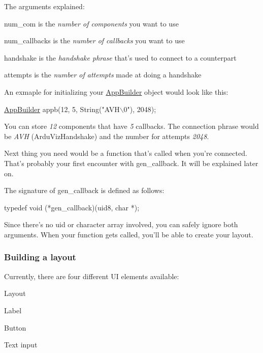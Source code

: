 The arguments explained\+:
\begin{DoxyItemize}
\item {\ttfamily num\+\_\+com} is the {\itshape number of components} you want to use
\item {\ttfamily num\+\_\+callbacks} is the {\itshape number of callbacks} you want to use
\item {\ttfamily handshake} is the {\itshape handshake phrase} that's used to connect to a counterpart
\item {\ttfamily attempts} is the {\itshape number of attempts} made at doing a handshake
\end{DoxyItemize}

An exmaple for initializing your \hyperlink{class_app_builder}{App\+Builder} object would look like this\+:


\begin{DoxyCode}
\hyperlink{class_app_builder}{AppBuilder} appb(12, 5, String(\textcolor{stringliteral}{"AVH\(\backslash\)0"}), 2048);
\end{DoxyCode}


You can store {\itshape 12} components that have {\itshape 5} callbacks. The connection phrase would be {\itshape A\+V\+H} (Ardu\+Viz\+Handshake) and the number for attempts {\itshape 2048}.

Next thing you need would be a function that's called when you're connected. That's probably your first encounter with {\ttfamily gen\+\_\+callback}. It will be explained later on.

The signature of {\ttfamily gen\+\_\+callback} is defined as follows\+: 
\begin{DoxyCode}
\textcolor{keyword}{typedef} void (*gen\_callback)(uid8, \textcolor{keywordtype}{char} *);
\end{DoxyCode}


Since there's no uid or character array involved, you can safely ignore both arguments. When your function gets called, you'll be able to create your layout.

\subsubsection*{Building a layout}

Currently, there are four different U\+I elements available\+:
\begin{DoxyItemize}
\item Layout
\item Label
\item Button
\item Text input
\end{DoxyItemize}


